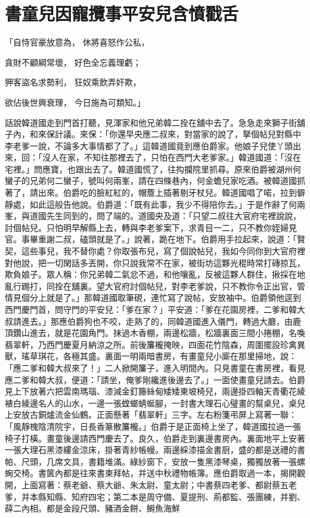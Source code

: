 %

\chapter{書童兒因寵攬事\KG 平安兒含憤戳舌}

「自恃官豪放意為，  休將喜怒作公私，

貪財不顧綱常壞，  好色全忘義理虧；

狎客盜名求勢利，  狂奴乘飲弄奸欺，

欲佔後世興衰理，  今日施為可類知。」

話說韓道國走到門首打聽，見渾家和他兄弟韓二拴在舖中去了。急急走來獅子街舖子內，和來保計議。來保：「你還早央應二叔來，對當家的說了，拏個帖兒對縣中李老爹一說，不論多大事情都了了。」這韓道國竟到應伯爵家。他娘子兒使丫頭出來，回：「沒人在家，不知往那裡去了，只怕在西門大老爹家。」韓道國道：「沒在宅裡。」問應寶，也跟出去了。韓道國慌了，往抅攔院里抓尋。原來伯爵被湖州何蠻子的兄弟何二蠻子，號叫何兩峯，請在四條巷內，何金蟾兒家吃酒。被韓道國抓著了，請出來。伯爵吃的臉紅紅的，帽簷上插著剔牙杖兒。韓道國唱了喏，拉到僻靜處，如此這般告他說。伯爵道：「既有此事，我少不得陪你去。」于是作辭了何兩峯，與道國先生同到的，問了端的。道國央及道：「只望二叔往大官府宅裡說說，討個帖兒。只怕明早解縣上去，轉與李老爹案下，求青目一二，只不教你姪婦見官。事畢重謝二叔，磕頭就是了。」說著，跪在地下。伯爵用手拉起來，說道：「賢契，這些事兒，我不替你處？你取張布兒，寫了個說帖兒，我如今同你到大官府裡對他說，把一切閑話多丟開，你只說我常不在家，被街坊這夥光棍時常打磚掠瓦，欺負娘子。眾人稱：你兄弟韓二氣忿不過，和他嚷亂，反被這夥人群住，揪採在地亂行踢打，同拴在舖裏。望大官府討個帖兒，對李老爹說，只不教你令正出官，管情見個分上就是了。」那韓道國取筆硯，連忙寫了說帖，安放袖中。伯爵領他逕到西門慶門首，問守門的平安兒：「爹在家？」平安道：「爹在花園房裡，二爹和韓大叔請進去。」那應伯爵狗也不咬，走熟了的，同韓道國進入儀門，轉過大廳，由鹿頂鑽山進去，就是花園角門。抹過木香棚，兩邊松牆，松牆裏面三間小捲棚，名喚翡翠軒，乃西門慶夏月納涼之所。前後簾櫳掩映，四面花竹陰森，周圍擺設珍禽異獸，瑤草琪花，各極其盛。裏面一明兩暗書房，有畫童兒小廝在那里掃地，說：「應二爹和韓大叔來了！」二人掀開簾子，進入明間內。只見書童在書房裡，看見應二爹和韓大叔，便道：「請坐，俺爹剛纔進後邊去了。」一面使畫童兒請去。伯爵見上下放著六把雲南瑪瑙、漆減金釘籐絲甸矮矮東坡椅兒，兩邊掛四軸天青衢花綾裱白綾邊名人的山水，一邊一張螳螂蜻蜒腳，一封書大理石心璧畫的幫桌兒，桌兒上安放古銅爐流金仙鶴。正面懸著「翡翠軒」三字。左右粉箋弔屏上寫著一聯：「風靜槐陰清院宇，日長香篆散簾櫳。」伯爵于是正面椅上坐了，韓道國拉過一張椅子打橫。畫童後邊請西門慶去了。良久，伯爵走到裏邊書房內。裏面地平上安著一張大理石黑漆縷金涼床，掛著青紗帳幔。兩邊綵漆描金書厨，盛的都是送禮的書帕、尺頭，几席文具，書籍堆滿。綠紗窗下，安放一隻黑漆琴桌，獨獨放著一張螺蜔交椅。書篋內都是往來書柬拜帖，并送中秋禮物帳簿。應伯爵取過一本，揭開觀開，上面寫著：蔡老爺、蔡大爺、朱太尉、童太尉；中書蔡四老爹、都尉蔡五老爹，并本縣知縣、知府四宅；第二本是周守備、夏提刑、荊都監、張團練，并劉、薛二內相。都是金段尺頭、豬酒金餅、鰣魚海鮮 
